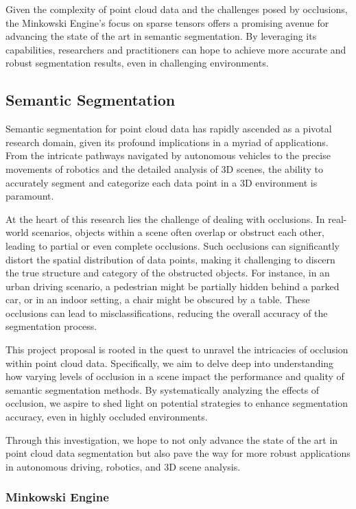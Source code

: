 \documentclass[11pt, a4paper,oneside,chapterprefix=false]{scrbook}
\begin{document}
Given the complexity of point cloud data and the challenges posed by occlusions, the Minkowski Engine's focus on sparse tensors offers a promising avenue for advancing the state of the art in semantic segmentation. By leveraging its capabilities, researchers and practitioners can hope to achieve more accurate and robust segmentation results, even in challenging environments.

\subsection{Semantic Segmentation}
Semantic segmentation for point cloud data has rapidly ascended as a pivotal research domain, given its profound implications in a myriad of applications. From the intricate pathways navigated by autonomous vehicles to the precise movements of robotics and the detailed analysis of 3D scenes, the ability to accurately segment and categorize each data point in a 3D environment is paramount.

At the heart of this research lies the challenge of dealing with occlusions. In real-world scenarios, objects within a scene often overlap or obstruct each other, leading to partial or even complete occlusions. Such occlusions can significantly distort the spatial distribution of data points, making it challenging to discern the true structure and category of the obstructed objects. For instance, in an urban driving scenario, a pedestrian might be partially hidden behind a parked car, or in an indoor setting, a chair might be obscured by a table. These occlusions can lead to misclassifications, reducing the overall accuracy of the segmentation process.

This project proposal is rooted in the quest to unravel the intricacies of occlusion within point cloud data. Specifically, we aim to delve deep into understanding how varying levels of occlusion in a scene impact the performance and quality of semantic segmentation methods. By systematically analyzing the effects of occlusion, we aspire to shed light on potential strategies to enhance segmentation accuracy, even in highly occluded environments.

Through this investigation, we hope to not only advance the state of the art in point cloud data segmentation but also pave the way for more robust applications in autonomous driving, robotics, and 3D scene analysis.

\subsubsection{Minkowski Engine}
\end{document}

